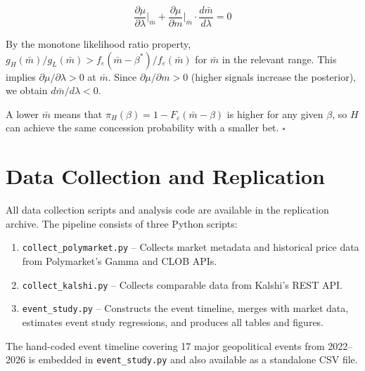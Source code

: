 \documentclass[12pt]{article}
\begin{document}
\begin{equation}
\frac{\partial \mu}{\partial \lambda}\bigg|_{\bar{m}} + \frac{\partial \mu}{\partial m}\bigg|_{\bar{m}} \cdot \frac{d\bar{m}}{d\lambda} = 0
\end{equation}

By the monotone likelihood ratio property, $g_H(\bar{m})/g_L(\bar{m}) > f_\varepsilon(\bar{m}-\beta^*)/f_\varepsilon(\bar{m})$ for $\bar{m}$ in the relevant range. This implies $\partial \mu/\partial \lambda > 0$ at $\bar{m}$. Since $\partial \mu/\partial m > 0$ (higher signals increase the posterior), we obtain $d\bar{m}/d\lambda < 0$.

A lower $\bar{m}$ means that $\pi_H(\beta) = 1 - F_\varepsilon(\bar{m} - \beta)$ is higher for any given $\beta$, so $H$ can achieve the same concession probability with a smaller bet. $\square$


\section{Data Collection and Replication}\label{app:replication}

All data collection scripts and analysis code are available in the replication archive. The pipeline consists of three Python scripts:

\begin{enumerate}
    \item \texttt{collect\_polymarket.py} -- Collects market metadata and historical price data from Polymarket's Gamma and CLOB APIs.
    \item \texttt{collect\_kalshi.py} -- Collects comparable data from Kalshi's REST API.
    \item \texttt{event\_study.py} -- Constructs the event timeline, merges with market data, estimates event study regressions, and produces all tables and figures.
\end{enumerate}

The hand-coded event timeline covering 17 major geopolitical events from 2022--2026 is embedded in \texttt{event\_study.py} and also available as a standalone CSV file.
\end{document}
